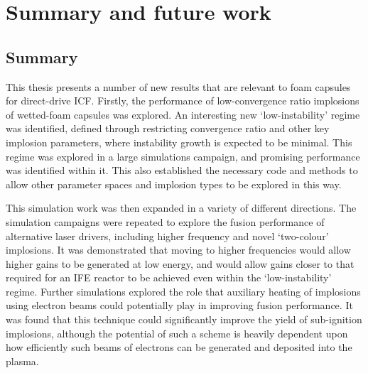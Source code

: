 

\chapter{Summary and future work} \label{ch:Conclusion}

\minitoc

\section{Summary}

This thesis presents a number of new results that are relevant to foam capsules for direct-drive ICF. Firstly, the performance of low-convergence ratio implosions of wetted-foam capsules was explored. An interesting new `low-instability' regime was identified, defined through restricting convergence ratio and other key implosion parameters, where instability growth is expected to be minimal. This regime was explored in a large simulations campaign, and promising performance was identified within it. This also established the necessary code and methods to allow other parameter spaces and implosion types to be explored in this way.

This simulation work was then expanded in a variety of different directions. The simulation campaigns were repeated to explore the fusion performance of alternative laser drivers, including higher frequency and novel `two-colour' implosions. It was demonstrated that moving to higher frequencies would allow higher gains to be generated at low energy, and would allow gains closer to that required for an IFE reactor to be achieved even within the `low-instability' regime. Further simulations explored the role that auxiliary heating of implosions using electron beams could potentially play in improving fusion performance. It was found that this technique could significantly improve the yield of sub-ignition implosions, although the potential of such a scheme is heavily dependent upon how efficiently such beams of electrons can be generated and deposited into the plasma.

